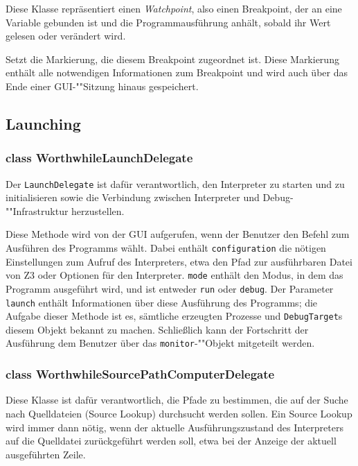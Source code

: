 Diese Klasse repräsentiert einen \textit{Watchpoint}, also einen Breakpoint, der an eine Variable gebunden ist und die Programmausführung anhält, sobald ihr Wert gelesen oder verändert wird.

\begin{description}
	 Setzt die Markierung, die diesem Breakpoint zugeordnet ist. Diese Markierung enthält alle notwendigen Informationen zum Breakpoint und wird auch über das Ende einer GUI-""Sitzung hinaus gespeichert.
\end{description}

\subsection{Launching}

\subsubsection{class WorthwhileLaunchDelegate}

Der \texttt{LaunchDelegate} ist dafür verantwortlich, den Interpreter zu starten und zu initialisieren sowie die Verbindung zwischen Interpreter und Debug-""Infrastruktur herzustellen.

\begin{description}
	Diese Methode wird von der GUI aufgerufen, wenn der Benutzer den Befehl zum Ausführen des Programms wählt. Dabei enthält \texttt{configuration} die nötigen Einstellungen zum Aufruf des Interpreters, etwa den Pfad zur ausführbaren Datei von Z3 oder Optionen für den Interpreter. \texttt{mode} enthält den Modus, in dem das Programm ausgeführt wird, und ist entweder \texttt{run} oder \texttt{debug}. Der Parameter \texttt{launch} enthält Informationen über diese Ausführung des Programms; die Aufgabe dieser Methode ist es, sämtliche erzeugten Prozesse und \texttt{DebugTarget}s diesem Objekt bekannt zu machen. Schließlich kann der Fortschritt der Ausführung dem Benutzer über das \texttt{monitor}-""Objekt mitgeteilt werden.
\end{description}

\subsubsection{class WorthwhileSourcePathComputerDelegate}

Diese Klasse ist dafür verantwortlich, die Pfade zu bestimmen, die auf der Suche nach Quelldateien (Source Lookup) durchsucht werden sollen. Ein Source Lookup wird immer dann nötig, wenn der aktuelle Ausführungszustand des Interpreters auf die Quelldatei zurückgeführt werden soll, etwa bei der Anzeige der aktuell ausgeführten Zeile.

